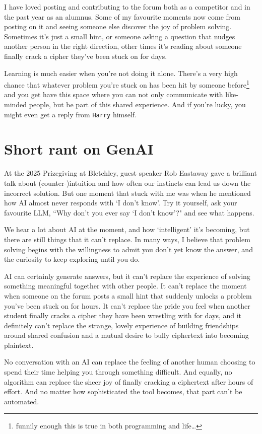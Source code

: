 I have loved posting and contributing to the forum both as a competitor and in the past year as an alumnus. Some of my favourite moments now come from posting on it and seeing someone else discover the joy of problem solving. Sometimes it’s just a small hint, or someone asking a question that nudges another person in the right direction, other times it’s reading about someone finally crack a cipher they’ve been stuck on for days.

Learning is much easier when you're not doing it alone. There’s a very high chance that whatever problem you’re stuck on has been hit by someone before\footnote{funnily enough this is true in both programming and life…} and you get have this space where you can not only communicate with like-minded people, but be part of this shared experience. And if you're lucky, you might even get a reply from \texttt{Harry} himself. 


\section{Short rant on GenAI}

At the 2025 Prizegiving at Bletchley, guest speaker Rob Eastaway gave a brilliant talk about (counter-)intuition and how often our instincts can lead us down the incorrect solution. But one moment that stuck with me was when he mentioned how AI almost never responds with `I don’t know'. Try it yourself, ask your favourite LLM, ``Why don’t you ever say `I don’t know'?" and see what happens.

We hear a lot about AI at the moment, and how `intelligent' it’s becoming, but there are still things that it can’t replace. In many ways, I believe that problem solving begins with the willingness to admit you don’t yet know the answer, and the curiosity to keep exploring until you do.

AI can certainly generate answers, but it can’t replace the experience of solving something meaningful together with other people. It can’t replace the moment when someone on the forum posts a small hint that suddenly unlocks a problem you’ve been stuck on for hours. It can’t replace the pride you feel when another student finally cracks a cipher they have been wrestling with for days, and it definitely can’t replace the strange, lovely experience of building friendships around shared confusion and a mutual desire to bully ciphertext into becoming plaintext.

No conversation with an AI can replace the feeling of another human choosing to spend their time helping you through something difficult. And equally, no algorithm can replace the sheer joy of finally cracking a ciphertext after hours of effort. And no matter how sophisticated the tool becomes, that part can’t be automated.

